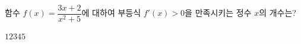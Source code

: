 함수 $f(x)=\dfrac{3x+2}{x^2+5}$에 대하여 부등식 $f'(x)>0$을 만족시키는 정수 $x$의 개수는?
\begin{choices32}{$1$}{$2$}{$3$}{$4$}{$5$}\end{choices32}
